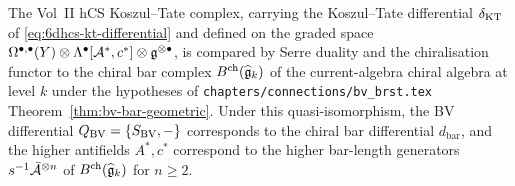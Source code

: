 \begin{theorem}
\label{thm:cfg-kt-bar-cobar}
The Vol~II hCS Koszul--Tate complex, carrying the Koszul--Tate
differential $\delta_{\mathrm{KT}}$ of \eqref{eq:6dhcs-kt-differential} and
defined on the graded space
$\Omega^{\bullet,\bullet}(Y)\otimes\Lambda^\bullet[\mathcal{A}^*,c^*]
\otimes\mathfrak{g}^{\otimes\bullet}$, is compared by Serre duality and the
chiralisation functor to the chiral bar complex
$B^{\mathrm{ch}}(\widehat{\mathfrak{g}}_k)$ of the current-algebra chiral algebra
at level $k$ under the hypotheses of
\texttt{chapters/connections/bv\_brst.tex}
Theorem~\ref{thm:bv-bar-geometric}. Under this quasi-isomorphism, the
BV differential $Q_{\mathrm{BV}}=\{S_{\mathrm{BV}},-\}$ corresponds to the chiral bar
differential $d_{\mathrm{bar}}$, and the higher antifields
$A^*,c^*$ correspond to the higher bar-length generators
$s^{-1}\bar{\mathcal{A}}^{\otimes n}$ of $B^{\mathrm{ch}}(\widehat{\mathfrak{g}}_k)$ for
$n\geq 2$.
\end{theorem}

